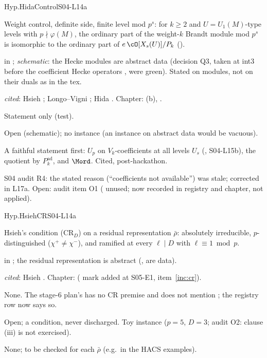 \begin{hypentry}{Hyp.HidaControl}{\kindlit}{S04-L14a}
\item[Statement] Weight control, definite side, finite level mod $p^s$: for $k\ge2$ and $U=U_1(M)$-type levels with
  $p\nmid\varphi(M)$, the ordinary part of the weight-$k$ Brandt module mod $p^s$ is isomorphic to the ordinary part of
  $e\,\cO[X_s(U)]/P_k$ ().
\item[Lean]  in ;
  \emph{schematic}: the Hecke modules are abstract data (decision Q3, taken at int3 before the coefficient Hecke
  operators ,  were green). Stated on modules, not on their duals as
  in the tex.
\item[Source] \emph{cited}: Hsieh \cite[Thm.~4.2(2)]{Hs}; Longo--Vigni \cite[Thm.~3.7]{LV11}; Hida
  \cite[Thm.~9.4]{Hi88b}. Chapter: (b), .
\item[Used by] Statement only (test).
\item[Status] Open (schematic); no instance (an instance on abstract data would be vacuous).
\item[Discharge] A faithful statement first: $U_p$ on $V_k$-coefficients at all levels $U_s$ (, S04-L15b),
  the quotient by $P^{\mathrm{ad}}_k$, and $\Mord$. Cited, post-hackathon.
\item[History] S04 audit R4: the stated reason (``coefficients not available'') was stale; corrected in L17a.
  Open: audit item O1 ( unused; now recorded in registry and chapter, not applied).
\end{hypentry}

\begin{hypentry}{Hyp.HsiehCR}{\kindcond}{S04-L14a}
\item[Statement] Hsieh's condition (CR$_D$) on a residual representation $\bar\rho$: absolutely irreducible,
  $p$-distinguished ($\chi^+\ne\chi^-$), and ramified at every $\ell\mid D$ with $\ell\equiv1\bmod p$.
\item[Lean]  in ; the residual
  representation is abstract (,  are data).
\item[Source] \emph{cited}: Hsieh \cite[\S1.4, Hyp.~(CR,$\Sigma$)]{Hs}. Chapter:  ( mark added at S05-E1, item~\ref{inc:cr}).
\item[Used by] None. The stage-6 plan's  has no CR premise and does not mention ; the registry row now says so.
\item[Status] Open; a condition, never discharged. Toy instance 
  ($p=5$, $D=3$; audit O2: clause (iii) is not exercised).
\item[Discharge] None; to be checked for each $\bar\rho$ (e.g.\ in the HACS examples).
\end{hypentry}

